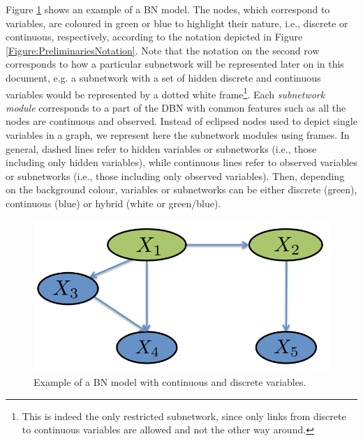 Figure \ref{Figure:GeneralBayesianNetwork} shows an example of a BN model. The nodes, which correspond to variables, are coloured in green or blue to highlight their nature, i.e., discrete or continuous, respectively, according to the notation depicted in Figure \ref{Figure:PreliminariesNotation}. Note that the notation on the second row corresponds to how a particular subnetwork will be represented later on in this document, e.g. a subnetwork with a set of hidden discrete and continuous variables would be represented by a dotted white frame\footnote{This is indeed the only restricted subnetwork, since only links from discrete to continuous variables are allowed and not the other way around.}. Each \textit{subnetwork module} corresponds to a part of the DBN with common features such as all the nodes are continuous and observed. Instead of eclipsed nodes used to depict single variables in a graph, we represent here the subnetwork modules using frames. In general, dashed lines refer to hidden variables or subnetworks (i.e., those including only hidden variables), while continuous lines refer to observed variables or subnetworks (i.e., those including only observed variables). Then, depending on the background colour, variables or subnetworks can be either discrete (green), continuous (blue) or hybrid (white or green/blue).

\begin{figure}[ht!]
\begin{center}
\includegraphics[scale=0.25]{./figures/PreliminariesGeneralBayesianNetwork}
\caption{\label{Figure:GeneralBayesianNetwork}Example of a BN model with continuous and discrete variables.
}
\end{center}
\end{figure}

